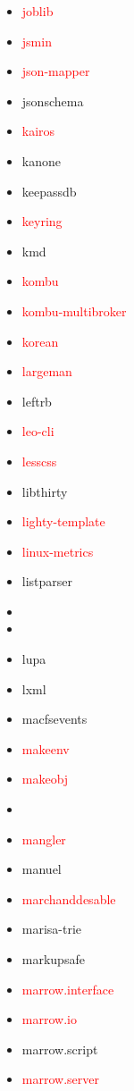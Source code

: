 \documentclass{l4proj}
\begin{document}
\begin{appendices}
{\begin{itemize}
\item\textcolor{red}{joblib}
\item\textcolor{red}{jsmin}
\item\textcolor{red}{json-mapper}
\item jsonschema
\item\textcolor{red}{kairos}
\item kanone
\item keepassdb
\item\textcolor{red}{keyring}
\item kmd
\item\textcolor{red}{kombu}
\item\textcolor{red}{kombu-multibroker}
\item\textcolor{red}{korean}
\item\textcolor{red}{largeman}
\item leftrb
\item\textcolor{red}{leo-cli}
\item\textcolor{red}{lesscss}
\item libthirty
\item\textcolor{red}{lighty-template}
\item\textcolor{red}{linux-metrics}
\item listparser
\item {}
\item {}
\item lupa
\item lxml
\item macfsevents
\item\textcolor{red}{makeenv}
\item\textcolor{red}{makeobj}
\item\textcolor{red}{}
\item\textcolor{red}{mangler}
\item manuel
\end{itemize}
}%
\noindent\parbox[t]{0.32\textwidth}{\raggedright%
\begin{itemize}
\item\textcolor{red}{marchanddesable}
\item marisa-trie
\item markupsafe
\item\textcolor{red}{marrow.interface}
\item\textcolor{red}{marrow.io}
\item marrow.script
\item\textcolor{red}{marrow.server}

\end{itemize}}
\end{appendices}
\end{document}
